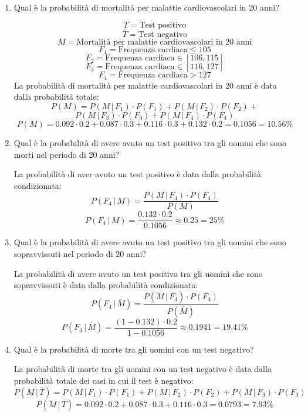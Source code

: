 \documentclass[a4paper]{article}
\theoremstyle{break}
\theoremstyle{break}
\theoremstyle{break}
\theoremstyle{break}
\begin{document}
\begin{enumerate}
	\item Qual è la probabilità di mortalità per malattie cardiovascolari in 20 anni?

	      \vspace{1em}
	      \[
		      T = \text{Test positivo}
	      \]
	      \[
		      \overline{T} = \text{Test negativo}
	      \]
	      \[
		      M = \text{Mortalità per malattie cardiovascolari in 20 anni}
	      \]
	      \[
		      F_1 = \text{Frequenza cardiaca} \le 105
	      \]
	      \[
		      F_2 = \text{Frequenza cardiaca} \in [106, 115]
	      \]
	      \[
		      F_3 = \text{Frequenza cardiaca} \in [116, 127]
	      \]
	      \[
		      F_4 = \text{Frequenza cardiaca} > 127
	      \]
	      La probabilità di mortalità per malattie cardiovascolari in 20 anni è data dalla probabilità
	      totale:
	      \[
		      P(M) = P(M\,|\,F_1) \cdot P(F_1) + P(M\,|\,F_2) \cdot P(F_2) +
	      \]
	      \[
		      P(M\,|\,F_3) \cdot P(F_3) + P(M\,|\,F_4) \cdot P(F_4)
	      \]
	      \[
		      P(M) = 0.092 \cdot 0.2 + 0.087 \cdot 0.3 + 0.116 \cdot 0.3 + 0.132 \cdot 0.2 = 0.1056 = 10.56\%
	      \]
	\item Qual è la probabilità di avere avuto un test positivo tra gli uomini che sono
	      morti nel periodo di 20 anni?

	      \vspace{1em}
	      La probabilità di aver avuto un test positivo è data dalla probabilità condizionata:
	      \[
		      P(F_4\,|\,M) = \frac{P(M\,|\,F_4) \cdot P(F_4)}{P(M)}
	      \]
	      \[
		      P(F_4\,|\,M) = \frac{0.132 \cdot 0.2}{0.1056} \approx 0.25 = 25\%
	      \]
	\item Qual è la probabilità di avere avuto un test positivo tra gli uomini che sono
	      sopravvissuti nel periodo di 20 anni?

	      \vspace{1em}
	      La probabilità di avere avuto un test positivo tra gli uomini che sono sopravvissuti
	      è data dalla probabilità condizionata:
	      \[
		      P(F_4\,|\,\overline{M}) = \frac{P(\overline{M}\,|\,F_4) \cdot P(F_4)}{P(\overline{M})}
	      \]
	      \[
		      P(F_4\,|\, \overline{M}) = \frac{(1-0.132) \cdot 0.2}{1-0.1056} \approx 0.1941 = 19.41\%
	      \]
	\item Qual è la probabilità di morte tra gli uomini con un test negativo?

	      \vspace{1em}
	      La probabilità di morte tra gli uomini con un test negativo è data dalla probabilità
	      totale dei casi in cui il test è negativo:
	      \[
		      P(M\,|\,\overline{T}) = P(M\,|\,F_1) \cdot P(F_1) + P(M\,|\,F_2) \cdot P(F_2) +P(M\,|\,F_3) \cdot P(F_3)
	      \]
	      \[
		      P(M\,|\,\overline{T}) = 0.092 \cdot 0.2 + 0.087 \cdot 0.3 + 0.116 \cdot 0.3 = 0.0793 = 7.93\%
	      \]
\end{enumerate}
\end{document}
